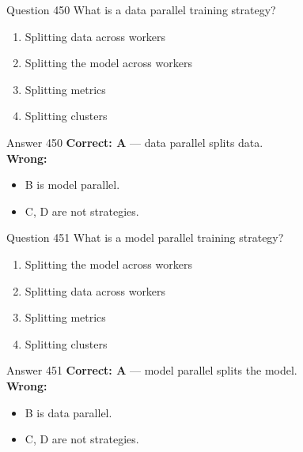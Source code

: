 \documentclass[aspectratio=169,11pt]{beamer}
\begin{document}
	\begin{frame}{Question 450}
		What is a data parallel training strategy?
		\begin{enumerate}[label=\Alph*.]
			\item Splitting data across workers
			\item Splitting the model across workers
			\item Splitting metrics
			\item Splitting clusters
		\end{enumerate}
	\end{frame}
	\begin{frame}{Answer 450}
		\textbf{Correct: A} --- data parallel splits data.\\
		\vspace{0.5em}
		\textbf{Wrong:}
		\begin{itemize}
			\item B is model parallel.
			\item C, D are not strategies.
		\end{itemize}
	\end{frame}
	
	\begin{frame}{Question 451}
		What is a model parallel training strategy?
		\begin{enumerate}[label=\Alph*.]
			\item Splitting the model across workers
			\item Splitting data across workers
			\item Splitting metrics
			\item Splitting clusters
		\end{enumerate}
	\end{frame}
	\begin{frame}{Answer 451}
		\textbf{Correct: A} --- model parallel splits the model.\\
		\vspace{0.5em}
		\textbf{Wrong:}
		\begin{itemize}
			\item B is data parallel.
			\item C, D are not strategies.
		\end{itemize}
	\end{frame}
	
\end{document}
